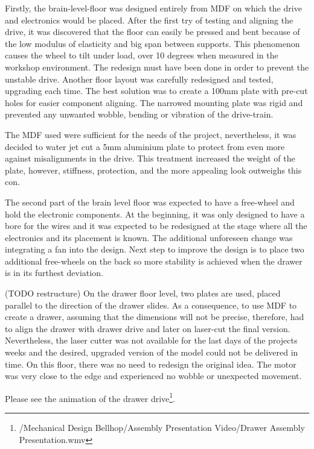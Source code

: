 \documentclass[11pt]{article}
\begin{document}
Firstly, the brain-level-floor was designed entirely from MDF on which the drive and electronics would be placed. After the first try of testing and aligning the drive, it was discovered that the floor can easily be pressed and bent because of the low modulus of elasticity and big span between supports. This phenomenon causes the wheel to tilt under load, over 10 degrees when measured in the workshop environment. The redesign must have been done in order to prevent the unstable drive. Another floor layout was carefully redesigned and tested, upgrading each time. The best solution was to create a 100mm plate with pre-cut holes for easier component aligning. The narrowed mounting plate was rigid and prevented any unwanted wobble, bending or vibration of the drive-train.


The MDF used were sufficient for the needs of the project, nevertheless, it was decided to water jet cut a 5mm aluminium plate to protect from even more against misalignments in the drive. This treatment increased the weight of the plate, however, stiffness, protection, and the more appealing look outweighs this con.


The second part of the brain level floor was expected to have a free-wheel and hold the electronic components. At the beginning, it was only designed to have a bore for the wires and it was expected to be redesigned at the stage where all the electronics and its placement is known. The additional unforeseen change was integrating a fan into the design. Next step to improve the design is to place two additional free-wheels on the back so more stability is achieved when the drawer is in its furthest deviation.


(TODO restructure) On the drawer floor level, two plates are used, placed parallel to the direction of the drawer slides. As a consequence, to use MDF to create a drawer, assuming that the dimensions will not be precise, therefore,  had to align the drawer with drawer drive and later on laser-cut the final version. Nevertheless, the laser cutter was not available for the last days of the projects weeks and the desired, upgraded version of the model could not be delivered in time. On this floor, there was no need to redesign the original idea. The motor was very close to the edge and experienced no wobble or unexpected movement.


Please see the animation of the drawer drive\footnote{/Mechanical Design Bellhop/Assembly Presentation Video/Drawer Assembly Presentation.wmv}.
\end{document}
